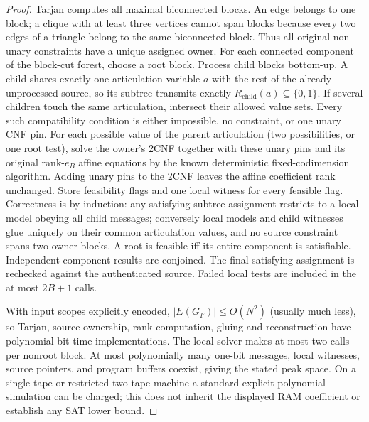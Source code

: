 \documentclass[10pt]{article}
\begin{document}
\begin{proof}
Tarjan computes all maximal biconnected blocks. An edge belongs to one block; a clique with at least three vertices cannot span blocks because every two edges of a triangle belong to the same biconnected block. Thus all original non-unary constraints have a unique assigned owner. For each connected component of the block-cut forest, choose a root block. Process child blocks bottom-up. A child shares exactly one articulation variable $a$ with the rest of the already unprocessed source, so its subtree transmits exactly $R_{\text{child}}(a)\subseteq\{0,1\}$. If several children touch the same articulation, intersect their allowed value sets. Every such compatibility condition is either impossible, no constraint, or one unary CNF pin. For each possible value of the parent articulation (two possibilities, or one root test), solve the owner's 2CNF together with these unary pins and its original rank-$e_B$ affine equations by the known deterministic fixed-codimension algorithm. Adding unary pins to the 2CNF leaves the affine coefficient rank unchanged. Store feasibility flags and one local witness for every feasible flag. Correctness is by induction: any satisfying subtree assignment restricts to a local model obeying all child messages; conversely local models and child witnesses glue uniquely on their common articulation values, and no source constraint spans two owner blocks. A root is feasible iff its entire component is satisfiable. Independent component results are conjoined. The final satisfying assignment is rechecked against the authenticated source. Failed local tests are included in the at most $2B+1$ calls.

With input scopes explicitly encoded, $|E(G_F)|\le O(N^2)$ (usually much less), so Tarjan, source ownership, rank computation, gluing and reconstruction have polynomial bit-time implementations. The local solver makes at most two calls per nonroot block. At most polynomially many one-bit messages, local witnesses, source pointers, and program buffers coexist, giving the stated peak space. On a single tape or restricted two-tape machine a standard explicit polynomial simulation can be charged; this does not inherit the displayed RAM coefficient or establish any SAT lower bound.
\end{proof}
\end{document}

